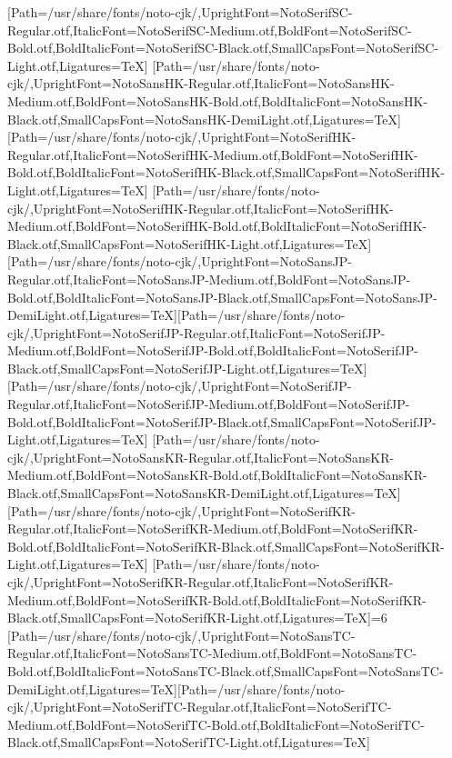 \newfontfamily{}[Path=/usr/share/fonts/noto-cjk/,UprightFont=NotoSerifSC-Regular.otf,ItalicFont=NotoSerifSC-Medium.otf,BoldFont=NotoSerifSC-Bold.otf,BoldItalicFont=NotoSerifSC-Black.otf,SmallCapsFont=NotoSerifSC-Light.otf,Ligatures=TeX]
\newfontfamily{}[Path=/usr/share/fonts/noto-cjk/,UprightFont=NotoSansHK-Regular.otf,ItalicFont=NotoSansHK-Medium.otf,BoldFont=NotoSansHK-Bold.otf,BoldItalicFont=NotoSansHK-Black.otf,SmallCapsFont=NotoSansHK-DemiLight.otf,Ligatures=TeX]\newfontfamily{}[Path=/usr/share/fonts/noto-cjk/,UprightFont=NotoSerifHK-Regular.otf,ItalicFont=NotoSerifHK-Medium.otf,BoldFont=NotoSerifHK-Bold.otf,BoldItalicFont=NotoSerifHK-Black.otf,SmallCapsFont=NotoSerifHK-Light.otf,Ligatures=TeX]
\newfontfamily{}[Path=/usr/share/fonts/noto-cjk/,UprightFont=NotoSerifHK-Regular.otf,ItalicFont=NotoSerifHK-Medium.otf,BoldFont=NotoSerifHK-Bold.otf,BoldItalicFont=NotoSerifHK-Black.otf,SmallCapsFont=NotoSerifHK-Light.otf,Ligatures=TeX]
\newfontfamily{}[Path=/usr/share/fonts/noto-cjk/,UprightFont=NotoSansJP-Regular.otf,ItalicFont=NotoSansJP-Medium.otf,BoldFont=NotoSansJP-Bold.otf,BoldItalicFont=NotoSansJP-Black.otf,SmallCapsFont=NotoSansJP-DemiLight.otf,Ligatures=TeX]\newfontfamily{}[Path=/usr/share/fonts/noto-cjk/,UprightFont=NotoSerifJP-Regular.otf,ItalicFont=NotoSerifJP-Medium.otf,BoldFont=NotoSerifJP-Bold.otf,BoldItalicFont=NotoSerifJP-Black.otf,SmallCapsFont=NotoSerifJP-Light.otf,Ligatures=TeX]
\newfontfamily{}[Path=/usr/share/fonts/noto-cjk/,UprightFont=NotoSerifJP-Regular.otf,ItalicFont=NotoSerifJP-Medium.otf,BoldFont=NotoSerifJP-Bold.otf,BoldItalicFont=NotoSerifJP-Black.otf,SmallCapsFont=NotoSerifJP-Light.otf,Ligatures=TeX]
\newfontfamily{}[Path=/usr/share/fonts/noto-cjk/,UprightFont=NotoSansKR-Regular.otf,ItalicFont=NotoSansKR-Medium.otf,BoldFont=NotoSansKR-Bold.otf,BoldItalicFont=NotoSansKR-Black.otf,SmallCapsFont=NotoSansKR-DemiLight.otf,Ligatures=TeX]\newfontfamily{}[Path=/usr/share/fonts/noto-cjk/,UprightFont=NotoSerifKR-Regular.otf,ItalicFont=NotoSerifKR-Medium.otf,BoldFont=NotoSerifKR-Bold.otf,BoldItalicFont=NotoSerifKR-Black.otf,SmallCapsFont=NotoSerifKR-Light.otf,Ligatures=TeX]
\newfontfamily{}[Path=/usr/share/fonts/noto-cjk/,UprightFont=NotoSerifKR-Regular.otf,ItalicFont=NotoSerifKR-Medium.otf,BoldFont=NotoSerifKR-Bold.otf,BoldItalicFont=NotoSerifKR-Black.otf,SmallCapsFont=NotoSerifKR-Light.otf,Ligatures=TeX]\else\ifnum\value{NotoCJKFamily}=6
\newfontfamily{}[Path=/usr/share/fonts/noto-cjk/,UprightFont=NotoSansTC-Regular.otf,ItalicFont=NotoSansTC-Medium.otf,BoldFont=NotoSansTC-Bold.otf,BoldItalicFont=NotoSansTC-Black.otf,SmallCapsFont=NotoSansTC-DemiLight.otf,Ligatures=TeX]\newfontfamily{}[Path=/usr/share/fonts/noto-cjk/,UprightFont=NotoSerifTC-Regular.otf,ItalicFont=NotoSerifTC-Medium.otf,BoldFont=NotoSerifTC-Bold.otf,BoldItalicFont=NotoSerifTC-Black.otf,SmallCapsFont=NotoSerifTC-Light.otf,Ligatures=TeX]
